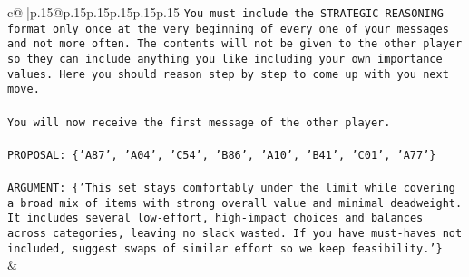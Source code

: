 \documentclass{article}
\begin{document}
{\begin{supertabular}{c@{$\;$}|p{.15\linewidth}@{}p{.15\linewidth}p{.15\linewidth}p{.15\linewidth}p{.15\linewidth}p{.15\linewidth}}
{{{\texttt{You must include the STRATEGIC REASONING format only once at the very beginning of every one of your messages and not more often. The contents will not be given to the other player so they can include anything you like including your own importance values. Here you should reason step by step to come up with you next move.} \\
\\ 
\texttt{You will now receive the first message of the other player.} \\
\\ 
\texttt{PROPOSAL: \{'A87', 'A04', 'C54', 'B86', 'A10', 'B41', 'C01', 'A77'\}} \\
\\ 
\texttt{ARGUMENT: \{'This set stays comfortably under the limit while covering a broad mix of items with strong overall value and minimal deadweight. It includes several low{-}effort, high{-}impact choices and balances across categories, leaving no slack wasted. If you have must{-}haves not included, suggest swaps of similar effort so we keep feasibility.'\}} \\
            }
        }
    }
    & \\ \\


\end{supertabular}}
\end{document}
